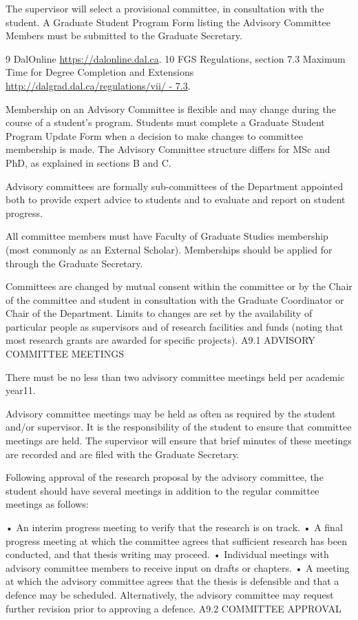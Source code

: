 \documentclass{article}
\newcommand\elink[1]{\url{#1}}
\begin{document}
The supervisor will select a provisional committee, in consultation with the student. A Graduate Student Program Form listing the Advisory Committee Members must be submitted to the Graduate Secretary.


9 DalOnline \elink{https://dalonline.dal.ca}.
10 FGS Regulations, section 7.3 Maximum Time for Degree Completion and Extensions \elink{http://dalgrad.dal.ca/regulations/vii/ - 7.3}.
 

Membership on an Advisory Committee is flexible and may change during the course of a student’s program. Students must complete a Graduate Student Program Update Form when a decision to make changes to committee membership is made. The Advisory Committee structure differs for MSc and PhD, as explained in sections B and C.

Advisory committees are formally sub-committees of the Department appointed both to provide expert advice to students and to evaluate and report on student progress.

All committee members must have Faculty of Graduate Studies membership (most commonly as an External Scholar). Memberships should be applied for through the Graduate Secretary.

Committees are changed by mutual consent within the committee or by the Chair of the committee and student in consultation with the Graduate Coordinator or Chair of the Department. Limits to changes are set by the availability of particular people as supervisors and of research facilities and funds (noting that most research grants are awarded for specific projects).
A9.1	ADVISORY COMMITTEE MEETINGS

There must be no less than two advisory committee meetings held per academic year11.

Advisory committee meetings may be held as often as required by the student and/or supervisor. It is the responsibility of the student to ensure that committee meetings are held. The supervisor will ensure that brief minutes of these meetings are recorded and are filed with the Graduate Secretary.

Following approval of the research proposal by the advisory committee, the student should have several meetings in addition to the regular committee meetings as follows:

•	An interim progress meeting to verify that the research is on track.
•	A final progress meeting at which the committee agrees that sufficient research has been conducted, and that thesis writing may proceed.
•	Individual meetings with advisory committee members to receive input on drafts or chapters.
•	A meeting at which the advisory committee agrees that the thesis is defensible and that a defence may be scheduled. Alternatively, the advisory committee may request further revision prior to approving a defence.
A9.2	COMMITTEE APPROVAL
\end{document}
